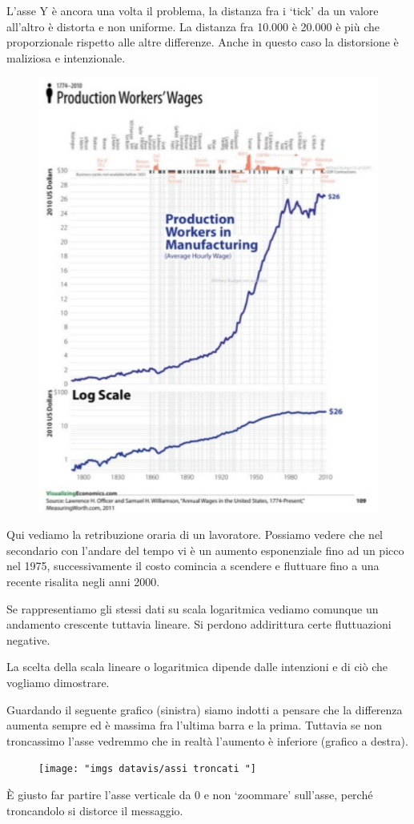 \documentclass[12pt,a4paper]{report}
\begin{document}
\newpage
L’asse Y è ancora una volta il problema, la distanza fra i ‘tick’ da un valore all'altro è distorta e non uniforme. La distanza fra 10.000 è 20.000 è più che proporzionale rispetto alle altre differenze. Anche in questo caso la distorsione è maliziosa e intenzionale.

\begin{figure}[h]
	\centering
	\includegraphics[width=0.4\linewidth]{"imgs datavis/log vs lineare"}
	\caption{}
	\label{fig:log-vs-lineare}
\end{figure}

Qui vediamo la retribuzione oraria di un lavoratore. Possiamo vedere che nel secondario con l'andare del tempo vi è un aumento esponenziale fino ad un picco nel 1975, successivamente il costo comincia a scendere e fluttuare fino a una recente risalita negli anni 2000.

Se rappresentiamo gli stessi dati su scala logaritmica vediamo comunque un andamento crescente tuttavia lineare. Si perdono addirittura certe fluttuazioni negative. 

La scelta della scala lineare o logaritmica dipende dalle intenzioni e di ciò che vogliamo dimostrare. 


Guardando il seguente grafico (sinistra) siamo indotti a pensare che la differenza aumenta sempre ed è massima fra l'ultima barra e la prima. Tuttavia se non troncassimo l'asse vedremmo che in realtà l'aumento è inferiore (grafico a destra). 

\begin{figure}[h]
	\centering
	\texttt{[image: "imgs datavis/assi troncati "]}
	\caption{}
	\label{fig:assi-troncati-}
\end{figure}

È giusto far partire l’asse verticale da 0 e non ‘zoommare’ sull'asse, perché troncandolo si distorce il messaggio. 
\end{document}
